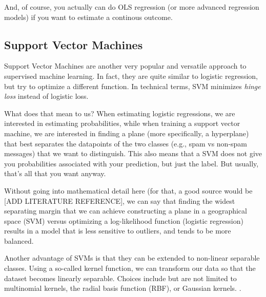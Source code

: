 And, of course, you actually can do OLS regression (or more advanced regression models) if you want to estimate a continous outcome.







\subsection{Support Vector Machines}
Support Vector Machines are another very popular and versatile approach to supervised machine learning.
In fact, they are quite similar to logistic regression, but try to optimize a different function. In technical terms, SVM minimizes \emph{hinge loss} instead of logistic loss.

What does that mean to us? When estimating logistic regressions, we are interested
in estimating probabilities, while when training a support vector machine, we are interested in finding a plane (more specifically, a hyperplane) that best separates the datapoints of the two classes (e.g., spam vs non-spam messages) that we want to distinguish.
This also means that a SVM does not give you probabilities associated with your prediction, but just the label.
But usually, that's all that you want anyway.

Without going into mathematical detail here (for that, a good source would be [ADD LITERATURE REFERENCE], we can say that finding the widest separating margin that we can achieve constructing a plane in a geographical space (SVM) versus optimizing a log-likelihood function (logistic regression) results in a model that is less sensitive to outliers, and tends to be more balanced.

Another advantage of SVMs is that they can be extended to non-linear separable classes. Using a so-called kernel function, we can transform our data so that the dataset becomes linearly separable. Choices include but are not limited to multinomial kernels, the radial basis function (RBF),  or Gaussian kernels. 
.



